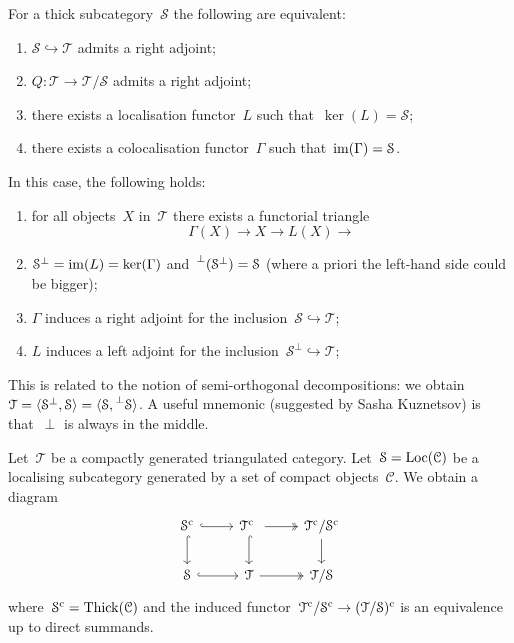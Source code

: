 \documentclass[10pt,a4paper]{article}
\begin{document}
\begin{proposition}
  For a thick subcategory~$\mathcal{S}$ the following are equivalent:
  \begin{enumerate}
    \item $\mathcal{S}\hookrightarrow\mathcal{T}$ admits a right adjoint;
    \item $Q\colon\mathcal{T}\to\mathcal{T}/\mathcal{S}$ admits a right adjoint;%
    \item there exists a localisation functor~$L$ such that~$\ker(L)=\mathcal{S}$;
    \item there exists a colocalisation functor~$\Gamma$ such that~$\operatorname{im}(\Gamma)=\mathcal{S}$.
  \end{enumerate}
\end{proposition}
In this case, the following holds:
\begin{enumerate}
  \item for all objects~$X$ in~$\mathcal{T}$ there exists a functorial triangle
    \begin{equation}
      \Gamma(X)\to X\to L(X)\to
    \end{equation}
  \item $\mathcal{S}^\perp=\operatorname{im}(L)=\ker(\Gamma)$ and~$\prescript{\perp}{}{(}\mathcal{S}^\perp)=\mathcal{S}$ (where a priori the left-hand side could be bigger);
  \item $\Gamma$ induces a right adjoint for the inclusion~$\mathcal{S}\hookrightarrow\mathcal{T}$;
  \item $L$ induces a left adjoint for the inclusion~$\mathcal{S}^\perp\hookrightarrow\mathcal{T}$;
\end{enumerate}
\begin{remark}
  This is related to the notion of semi-orthogonal decompositions: we obtain~$\mathcal{T}=\langle\mathcal{S}^\perp,\mathcal{S}\rangle=\langle\mathcal{S},\prescript{\perp}{}{\mathcal{S}}\rangle$. A useful mnemonic (suggested by Sasha Kuznetsov) is that~$\perp$ is always in the middle.
\end{remark}
\begin{example}
  Let~$\mathcal{T}$ be a compactly generated triangulated category. Let~$\mathcal{S}=\operatorname{Loc}(\mathcal{C})$ be a localising subcategory generated by a set of compact objects~$\mathcal{C}$. We obtain a diagram
  \begin{equation}
    \begin{tikzcd}
      \mathcal{S}^\cc \arrow[hook]{r} \arrow[hook]{d} & \mathcal{T}^\cc \arrow[two heads]{r} \arrow[hook]{d} & \mathcal{T}^\cc/\mathcal{S}^\cc \arrow{d} \\
      \mathcal{S} \arrow[hook]{r} & \mathcal{T} \arrow[two heads]{r} & \mathcal{T}/\mathcal{S}
    \end{tikzcd}
  \end{equation}
  where~$\mathcal{S}^{\mathrm{c}}=\operatorname{Thick}(\mathcal{C})$ and the induced functor~$\mathcal{T}^{\mathrm{c}}/\mathcal{S}^{\mathrm{c}}\to(\mathcal{T}/\mathcal{S})^{\mathrm{c}}$ is an equivalence up to direct summands.
\end{example}
\end{document}
